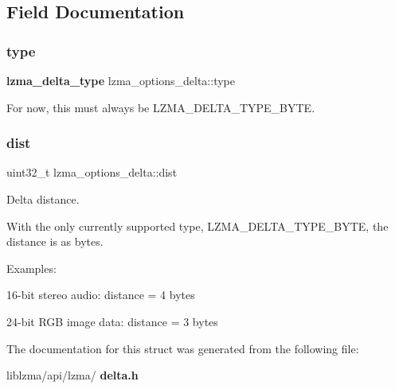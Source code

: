 \subsection{Field Documentation}
\mbox{\label{structlzma__options__delta_af3f1ece7f8c472f4a794953b414c7cd7}} 
\subsubsection{type}
{\footnotesize\ttfamily \textbf{ lzma\+\_\+delta\+\_\+type} lzma\+\_\+options\+\_\+delta\+::type}

For now, this must always be L\+Z\+M\+A\+\_\+\+D\+E\+L\+T\+A\+\_\+\+T\+Y\+P\+E\+\_\+\+B\+Y\+TE. \mbox{\label{structlzma__options__delta_a31b4b0b5a2462cb9433c2663b8a62790}} 
\subsubsection{dist}
{\footnotesize\ttfamily uint32\+\_\+t lzma\+\_\+options\+\_\+delta\+::dist}



Delta distance. 

With the only currently supported type, L\+Z\+M\+A\+\_\+\+D\+E\+L\+T\+A\+\_\+\+T\+Y\+P\+E\+\_\+\+B\+Y\+TE, the distance is as bytes.

Examples\+:
\begin{DoxyItemize}
\item 16-\/bit stereo audio\+: distance = 4 bytes
\item 24-\/bit R\+GB image data\+: distance = 3 bytes 
\end{DoxyItemize}

The documentation for this struct was generated from the following file\+:\begin{DoxyCompactItemize}
\item 
liblzma/api/lzma/\textbf{ delta.\+h}\end{DoxyCompactItemize}
